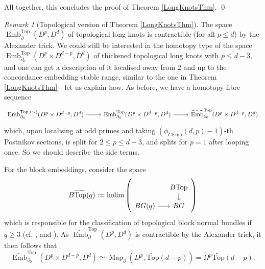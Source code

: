 \documentclass[a4paper, oneside]{amsart}
\newcommand{\emb}{\operatorname{Emb}}
\newcommand{\bemb}{\widetilde{\operatorname{Emb}}}
\newcommand{\cemb}{C\mathrm{Emb}}
\newcommand{\1}{\mathds{1}}
\newcommand{\map}{\operatorname{Map}}
\theoremstyle{remark}
\newtheorem{rem}[thm]{Remark}%
\theoremstyle{definition}
\numberwithin{equation}{section}
\begin{document}
All together, this concludes the proof of Theorem \ref{LongKnotsThm}. \qed





\begin{rem}[Topological version of Theorem \ref{LongKnotsThm}]\label{TopLongKnotRem} The space $\emb_{\partial}^{\mathrm{Top}}(D^p,D^d)$ of topological long knots is contractible (for all $p\leq d$)  by the Alexander trick. We could still be interested in the homotopy type of the space $\emb_{\partial_0}^{\mathrm{Top}}(D^p\times D^{d-p},D^d)$ of thickened topological long knots with $p\leq d-3$, and one can get a description of it localised away from $2$ and up to the concordance embedding stable range, similar to the one in Theorem \ref{LongKnotsThm}---let us explain how. As before, we have a homotopy fibre sequence
$$
\begin{tikzcd}
    \emb_{\partial_0}^{\mathrm{Top}, (\sim)}(D^p\times D^{d-p},D^d)\rar & \emb_{\partial_0}^{\mathrm{Top}}(D^p\times D^{d-p},D^d)\rar & \bemb_{\partial_0}^{\mathrm{Top}}(D^p\times D^{d-p},D^d)
\end{tikzcd}
$$
which, upon localising at odd primes and taking $(\phi_{\cemb}(d,p)-1)$-th Postnikov sections, is split for $2\leq p\leq d-3$, and splits for $p=1$ after looping once. So we should describe the side terms.

For the block embeddings, consider the space
$$
B\widetilde{\mathrm{Top}}(q):=\operatorname{holim}\left(\begin{tikzcd}[sep = small]
    &B\mathrm{Top}\dar\\
    BG(q)\rar & BG
\end{tikzcd}\right)
$$
which is responsible for the classification of topological block normal bundles if $q\geq 3$ (cf. \cite[\S 2]{RourkeSandI}, \cite{RourkeSandIII} and \cite[\S 11]{Wall}). As $\bemb^{\mathrm{Top}}_{\partial}(D^p,D^d)$ is contractible by the Alexander trick, it then follows that
$$
\bemb^{\mathrm{Top}}_{\partial_0}(D^p\times D^{d-p},D^d)\simeq \map_\partial(D^p,\widetilde{\mathrm{Top}}(d-p))=\Omega^{p}\widetilde{\mathrm{Top}}(d-p).
$$


\end{rem}
\end{document}
